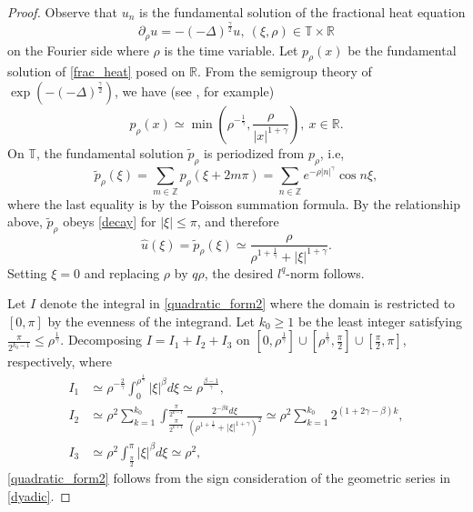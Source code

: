 \documentclass{article}
\numberwithin{equation}{section}
\begin{document}
\begin{proof}
Observe that $u_n$ is the fundamental solution of the fractional heat equation
\begin{equation}\label{frac_heat}
    \partial_\rho u = -(-\Delta)^{\frac{\gamma}{2}}u,\ (\xi,\rho) \in \mathbb{T}\times \mathbb{R}
\end{equation}
on the Fourier side where $\rho$ is the time variable. Let $p_\rho(x)$ be the fundamental solution of \eqref{frac_heat} posed on $\mathbb{R}$. 
From the semigroup theory of $\exp(-(-\Delta)^{\frac{\gamma}{2}})$, we have (see \cite[Section 2.6]{kwasnicki2017ten}, for example)
\begin{equation}\label{decay}
    p_\rho(x) \simeq \min(\rho^{-\frac{1}{\gamma}}, \frac{\rho}{|x|^{1+\gamma}}),\ x \in \mathbb{R}.
\end{equation}
On $\mathbb{T}$, the fundamental solution $\tilde{p}_\rho$ is periodized from $p_\rho$, i.e,
\begin{equation*}
    \tilde{p}_\rho(\xi) = \sum_{m \in \mathbb{Z}} p_\rho(\xi + 2m\pi) = \sum_{n\in\mathbb{Z}} e^{-\rho |n|^\gamma}\cos n\xi,
\end{equation*}
where the last equality is by the Poisson summation formula. By the relationship above, $\tilde{p}_\rho$ obeys \eqref{decay} for $|\xi| \leq \pi$, and therefore
\begin{equation*}
    \widehat{u}(\xi) = \tilde{p}_\rho(\xi) \simeq \frac{\rho}{\rho^{1+\frac{1}{\gamma}} + |\xi|^{1+\gamma}}.
\end{equation*}
Setting $\xi = 0$ and replacing $\rho$ by $q\rho$, the desired $l^q$-norm follows.

Let $I$ denote the integral in \eqref{quadratic_form2} where the domain is restricted to $[0,\pi]$ by the evenness of the integrand. Let $k_0 \geq 1$ be the least integer satisfying $\frac{\pi}{2^{k_0-1}} \leq \rho^{\frac{1}{\gamma}}$. Decomposing $I = I_1 + I_2 + I_3$ on $[0,\rho^{\frac{1}{\gamma}}] \cup [\rho^{\frac{1}{\gamma}},\frac{\pi}{2}] \cup [\frac{\pi}{2},\pi]$, respectively, where
\begin{align}\label{dyadic}
    I_1 &\simeq \rho^{-\frac{2}{\gamma}} \int_0^{\rho^{\frac{1}{\gamma}}} |\xi|^\beta d\xi \simeq \rho^{\frac{\beta-1}{\gamma}},\nonumber\\
    I_2 &\simeq \rho^2\sum_{k=1}^{k_0} \int_{\frac{\pi}{2^{k+1}}}^{\frac{\pi}{2^{k-1}}} \frac{2^{-\beta k}d\xi}{(\rho^{1+\frac{1}{\gamma}} + |\xi|^{1+\gamma})^2} \simeq \rho^2 \sum_{k=1}^{k_0} 2^{(1+2\gamma - \beta)k},\\
    I_3 &\simeq \rho^2 \int_{\frac{\pi}{2}}^{\pi} |\xi|^\beta d\xi \simeq \rho^2,\nonumber
\end{align}
\eqref{quadratic_form2} follows from the sign consideration of the geometric series in \eqref{dyadic}.
\end{proof}
\end{document}
